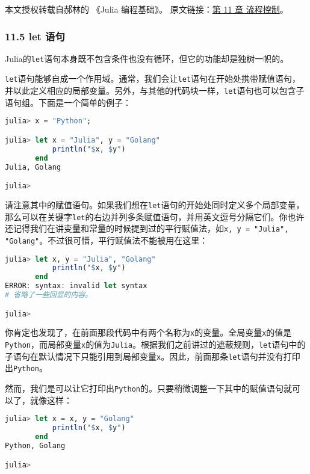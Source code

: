 
本文授权转载自郝林的 《Julia 编程基础》。 原文链接：\href{https://github.com/hyper0x/JuliaBasics/blob/master/book/ch11.md}{第 11 章 流程控制}。


\subsubsection{11.5 let 语句}

Julia的\verb`let`语句本身既不包含条件也没有循环，但它的功能却是独树一帜的。

\verb`let`语句能够自成一个作用域。通常，我们会让\verb`let`语句在开始处携带赋值语句，并以此定义相应的局部变量。另外，与其他的代码块一样，\verb`let`语句也可以包含子语句组。下面是一个简单的例子：

\begin{lstlisting}[language=julia]
julia> x = "Python";

julia> let x = "Julia", y = "Golang"
           println("$x, $y")
       end
Julia, Golang

julia> 
\end{lstlisting}

请注意其中的赋值语句。如果我们想在\verb`let`语句的开始处同时定义多个局部变量，那么可以在关键字\verb`let`的右边并列多条赋值语句，并用英文逗号分隔它们。你也许还记得我们在讲变量和常量的时候提到过的平行赋值法，如\verb`x, y = "Julia", "Golang"`。不过很可惜，平行赋值法不能被用在这里：

\begin{lstlisting}[language=julia]
julia> let x, y = "Julia", "Golang"
           println("$x, $y")
       end
ERROR: syntax: invalid let syntax
# 省略了一些回显的内容。

julia> 
\end{lstlisting}

你肯定也发现了，在前面那段代码中有两个名称为\verb`x`的变量。全局变量\verb`x`的值是\verb`Python`，而局部变量\verb`x`的值为\verb`Julia`。根据我们之前讲过的遮蔽规则，\verb`let`语句中的子语句在默认情况下只能引用到局部变量\verb`x`。因此，前面那条\verb`let`语句并没有打印出\verb`Python`。

然而，我们是可以让它打印出\verb`Python`的。只要稍微调整一下其中的赋值语句就可以了，就像这样：

\begin{lstlisting}[language=julia]
julia> let x = x, y = "Golang"
           println("$x, $y")
       end
Python, Golang

julia> 
\end{lstlisting}

